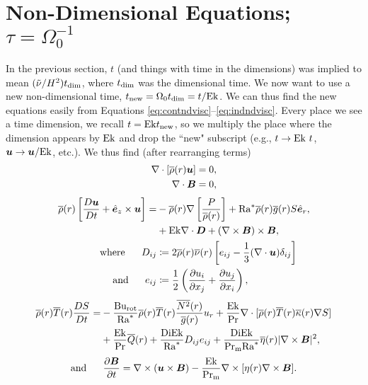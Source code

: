 \documentclass[12pt]{article}
\numberwithin{equation}{section}
\begin{document}
\section{Non-Dimensional Equations; $\tau=\Omega_0^{-1}$}
In the previous section, $t$ (and things with time in the dimensions) was implied to mean $(\tilde{\nu}/H^2) t_{\rm{dim}}$, where $t_{\rm{dim}}$ was the dimensional time. We now want to use a new non-dimensional time, $t_{\rm{new}}= \Omega_0t_{\rm{dim}} = t/{\rm{Ek}}$. We can thus find the new equations easily from Equations \eqref{eq:contndvisc}--\eqref{eq:indndvisc}. Every place we see a time dimension, we recall $t={\rm{Ek}} t_{\rm{new}}$, so we multiply the place where the dimension appears by ${\rm{Ek}}$ and drop the ``new" subscript (e.g., $t\rightarrow {\rm{Ek}}\ t$, $\bm{u}\rightarrow\bm{u}/{\rm{Ek}}$, etc.).  We thus find (after rearranging terms)
\begin{align}
	\nabla\cdot[\overline{\rho}(r)\bm{u}] &= 0\label{eq:contndrot},\\
	\nabla\cdot \bm{B} &= 0,
\end{align}
\begin{subequations}\label{eq:momndrot}
	\begin{align}
		\overline{\rho}(r)\left[\frac{D\bm{u}}{Dt} + \hat{\bm{e}}_z\times\bm{u}\right] = &-\overline{\rho}(r)\nabla\left[ \frac{P}{\overline{\rho}(r)} \right] + {\rm{Ra}}^* \overline{\rho}(r)\overline{g}(r) S\hat{\bm{e}}_r, \nonumber\\
		&+ {\rm{Ek}} \nabla\cdot\bm{D} +(\nabla\times\bm{B})\times\bm{B},\\
		\text{where}\ \ \ \ \  D_{ij} &\coloneqq 2\overline{\rho}(r)\overline{\nu}(r) \left[e_{ij} - \frac{1}{3}(\nabla\cdot\bm{u}) \delta_{ij} \right]\\
		\text{and}\ \ \ \ \  e_{ij} &\coloneqq \frac{1}{2}\left(\frac{\partial u_i}{\partial x_j} + \frac{\partial u_j}{\partial x_i} \right),
	\end{align}
\end{subequations}
\begin{align}\label{eq:enndrot}
	\overline{\rho}(r)\overline{T}(r) \frac{DS}{Dt} = &- \frac{{\rm{Bu_{rot}}}}{{\rm{Ra}}^*} \overline{\rho}(r)\overline{T}(r) \frac{\overline{N^2}(r)}{\overline{g}(r)} u_r + \frac{{\rm{Ek}}}{{\rm{Pr}}} \nabla\cdot[\overline{\rho}(r) \overline{T}(r) \overline{\kappa}(r) \nabla S] \nonumber \\
	&+ \frac{{\rm{Ek}}}{{\rm{Pr}}} \overline{Q}(r) + \frac{{\rm{Di}}{\rm{Ek}}}{{\rm{Ra}}^*} D_{ij}e_{ij} + \frac{{\rm{Di}}{\rm{Ek}}}{{\rm{Pr_m}}{\rm{Ra}}^*} \overline{\eta}(r)|\nabla\times\bm{B}|^2,
\end{align}
\begin{align}\label{eq:indndrot}
	\text{and}\ \ \ \ \  \frac{\partial\bm{B}}{\partial t} = \nabla\times(\bm{u}\times\bm{B}) - \frac{{\rm{Ek}}}{{\rm{Pr_m}}} \nabla\times[\eta(r)\nabla\times\bm{B}].
\end{align}	
\end{document}

